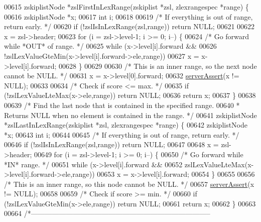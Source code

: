 \begin{DoxyCode}
00615 zskiplistNode *zslFirstInLexRange(zskiplist *zsl, zlexrangespec *range) \{
00616     zskiplistNode *x;
00617     \textcolor{keywordtype}{int} i;
00618 
00619     \textcolor{comment}{/* If everything is out of range, return early. */}
00620     \textcolor{keywordflow}{if} (!zslIsInLexRange(zsl,range)) \textcolor{keywordflow}{return} NULL;
00621 
00622     x = zsl->header;
00623     \textcolor{keywordflow}{for} (i = zsl->level-1; i >= 0; i--) \{
00624         \textcolor{comment}{/* Go forward while *OUT* of range. */}
00625         \textcolor{keywordflow}{while} (x->level[i].forward &&
00626             !zslLexValueGteMin(x->level[i].forward->ele,range))
00627                 x = x->level[i].forward;
00628     \}
00629 
00630     \textcolor{comment}{/* This is an inner range, so the next node cannot be NULL. */}
00631     x = x->level[0].forward;
00632     \hyperlink{server_8h_a88114b5169b4c382df6b56506285e56a}{serverAssert}(x != NULL);
00633 
00634     \textcolor{comment}{/* Check if score <= max. */}
00635     \textcolor{keywordflow}{if} (!zslLexValueLteMax(x->ele,range)) \textcolor{keywordflow}{return} NULL;
00636     \textcolor{keywordflow}{return} x;
00637 \}
00638 
00639 \textcolor{comment}{/* Find the last node that is contained in the specified range.}
00640 \textcolor{comment}{ * Returns NULL when no element is contained in the range. */}
00641 zskiplistNode *zslLastInLexRange(zskiplist *zsl, zlexrangespec *range) \{
00642     zskiplistNode *x;
00643     \textcolor{keywordtype}{int} i;
00644 
00645     \textcolor{comment}{/* If everything is out of range, return early. */}
00646     \textcolor{keywordflow}{if} (!zslIsInLexRange(zsl,range)) \textcolor{keywordflow}{return} NULL;
00647 
00648     x = zsl->header;
00649     \textcolor{keywordflow}{for} (i = zsl->level-1; i >= 0; i--) \{
00650         \textcolor{comment}{/* Go forward while *IN* range. */}
00651         \textcolor{keywordflow}{while} (x->level[i].forward &&
00652             zslLexValueLteMax(x->level[i].forward->ele,range))
00653                 x = x->level[i].forward;
00654     \}
00655 
00656     \textcolor{comment}{/* This is an inner range, so this node cannot be NULL. */}
00657     \hyperlink{server_8h_a88114b5169b4c382df6b56506285e56a}{serverAssert}(x != NULL);
00658 
00659     \textcolor{comment}{/* Check if score >= min. */}
00660     \textcolor{keywordflow}{if} (!zslLexValueGteMin(x->ele,range)) \textcolor{keywordflow}{return} NULL;
00661     \textcolor{keywordflow}{return} x;
00662 \}
00663 
00664 \textcolor{comment}{/*-----------------------------------------------------------------------------}

\end{DoxyCode}
